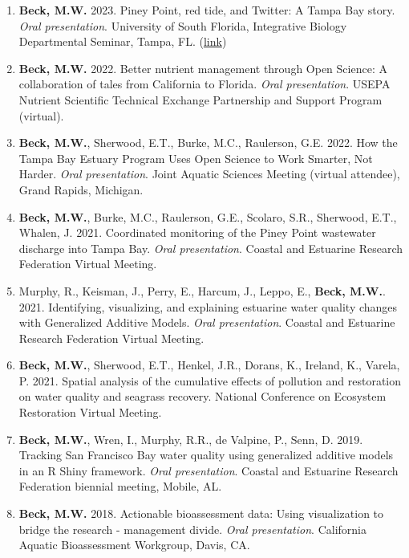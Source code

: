 \documentclass[letterpaper,12pt]{article}
\begin{document}
\begin{enumerate}
\item {\bf Beck, M.W.} 2023. Piney Point, red tide, and Twitter: A Tampa Bay story. \textit{Oral presentation}. University of South Florida, Integrative Biology Departmental Seminar, Tampa, FL. ({\footnotesize\href{https://docs.google.com/presentation/d/1yfXyuxaXU2CPLWnhtApxDpyS_xuhm9fh29jPpw6MaHE/edit?usp=share_link}{link}})

\item {\bf Beck, M.W.} 2022. Better nutrient management through Open Science: A collaboration of tales from California to Florida. \textit{Oral presentation}. USEPA Nutrient Scientific Technical Exchange Partnership and Support Program (virtual).  

\item {\bf Beck, M.W.}, Sherwood, E.T., Burke, M.C., Raulerson, G.E. 2022. How the Tampa Bay Estuary Program Uses Open Science to Work Smarter, Not Harder. \textit{Oral presentation}. Joint Aquatic Sciences Meeting (virtual attendee), Grand Rapids, Michigan. 

\item {\bf Beck, M.W.}, Burke, M.C., Raulerson, G.E., Scolaro, S.R., Sherwood, E.T., Whalen, J. 2021. Coordinated monitoring of the Piney Point wastewater discharge into Tampa Bay. \textit{Oral presentation}. Coastal and Estuarine Research Federation Virtual Meeting.

\item Murphy, R., Keisman, J., Perry, E., Harcum, J., Leppo, E., {\bf Beck, M.W.}. 2021. Identifying, visualizing, and explaining estuarine water quality changes with Generalized Additive Models. \textit{Oral presentation}. Coastal and Estuarine Research Federation Virtual Meeting.

\item {\bf Beck, M.W.},  Sherwood, E.T., Henkel, J.R., Dorans, K., Ireland, K., Varela, P. 2021. Spatial analysis of the cumulative effects of pollution and restoration on water quality and seagrass recovery.  National Conference on Ecosystem Restoration Virtual Meeting.

\item {\bf Beck, M.W.}, Wren, I., Murphy, R.R., de Valpine, P., Senn, D. 2019. Tracking San Francisco Bay water quality using generalized additive models in an R Shiny framework. \textit{Oral presentation}. Coastal and Estuarine Research Federation biennial meeting, Mobile, AL.

\item {\bf Beck, M.W.} 2018. Actionable bioassessment data: Using visualization to bridge the research - management divide. \textit{Oral presentation}. California Aquatic Bioassessment Workgroup, Davis, CA.


\end{enumerate}
\end{document}

